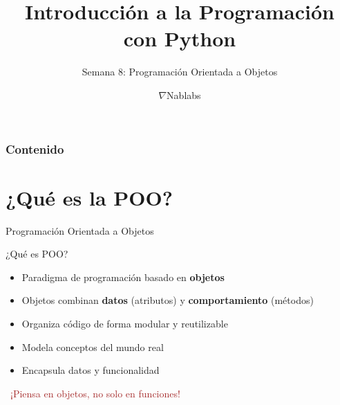 \documentclass{beamer}
\title{\textbf{Introducción a la Programación con Python}}
\subtitle{Semana 8: Programación Orientada a Objetos}
\author{$\nabla$Nablabs}
\date{}
\begin{document}
\begin{frame}
\titlepage
\end{frame}

\begin{frame}
\frametitle{Contenido}
\tableofcontents
\end{frame}

\section{¿Qué es la POO?}

\begin{frame}{Programación Orientada a Objetos \faCube}
\begin{conceptbox}{¿Qué es POO?}
\small
\begin{itemize}
    \item[\faBox] Paradigma de programación basado en \textbf{objetos}
    \item[\faPuzzlePiece] Objetos combinan \textbf{datos} (atributos) y \textbf{comportamiento} (métodos)
    \item[\faLayerGroup] Organiza código de forma modular y reutilizable
    \item[\faProjectDiagram] Modela conceptos del mundo real
    \item[\faShieldAlt] Encapsula datos y funcionalidad
\end{itemize}
\end{conceptbox}

\vspace{0.2cm}
\begin{center}
\large\textcolor{brown}{\faLightbulb\ ¡Piensa en objetos, no solo en funciones!}
\end{center}
\end{frame}
\end{document}
